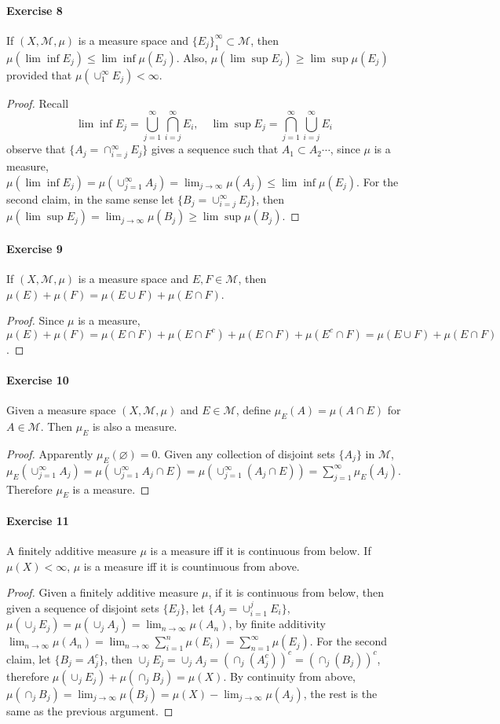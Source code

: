 \paragraph{Exercise 8}
If $(X,\mathcal{M},\mu)$ is a measure space and $\{E_j\}^\infty_1\subset\mathcal{M}$, then $\mu(\lim\inf E_j)\le\lim\inf\mu(E_j)$. Also, $\mu(\lim\sup E_j)\ge\lim\sup\mu(E_j)$ provided that $\mu(\cup^\infty_1E_j)<\infty$.
\begin{proof}
    Recall
    $$
    \lim\inf E_j=\bigcup_{j=1}^\infty\bigcap_{i=j}^\infty E_i,\quad \lim\sup E_j=\bigcap_{j=1}^\infty\bigcup_{i=j}^\infty E_i
    $$
    observe that $\{A_j=\cap^\infty_{i=j}E_j\}$ gives a sequence such that $A_1\subset A_2\cdots$, since $\mu$ is a measure, $\mu(\lim\inf E_j)=\mu(\cup^\infty_{j=1}A_j)=\lim_{j\to\infty}\mu(A_j)\le\lim\inf\mu(E_j)$. For the second claim, in the same sense let $\{B_j=\cup^\infty_{i=j}E_j\}$, then $\mu(\lim\sup E_j)=\lim_{j\to\infty}\mu(B_j)\ge\lim\sup\mu(B_j)$. 
\end{proof}
\paragraph{Exercise 9}
If $(X,\mathcal{M},\mu)$ is a measure space and $E,F\in\mathcal{M}$, then $\mu(E)+\mu(F)=\mu(E\cup F)+\mu(E\cap F)$.
\begin{proof}
    Since $\mu$ is a measure, $\mu(E)+\mu(F)=\mu(E\cap F)+\mu(E\cap F^c)+\mu(E\cap F)+\mu(E^c\cap F)=\mu(E\cup F)+\mu(E\cap F)$.
\end{proof}
\paragraph{Exercise 10}
Given a measure space $(X,\mathcal{M},\mu)$ and $E\in\mathcal{M}$, define $\mu_E(A)=\mu(A\cap E)$ for $A\in\mathcal{M}$. Then $\mu_E$ is also a measure.
\begin{proof}
    Apparently $\mu_E(\varnothing)=0$. Given any collection of disjoint sets $\{A_j\}$ in $\mathcal{M}$, $\mu_E(\cup^\infty_{j=1}A_j)=\mu(\cup^\infty_{j=1}A_j\cap E)=\mu(\cup^\infty_{j=1}(A_j\cap E))=\sum^\infty_{j=1}\mu_E(A_j)$. Therefore $\mu_E$ is a measure.
\end{proof}
\paragraph{Exercise 11}
A finitely additive measure $\mu$ is a measure iff it is continuous from below. If $\mu(X)<\infty$, $\mu$ is a measure iff it is countinuous from above.
\begin{proof}
    Given a finitely additive measure $\mu$, if it is continuous from below, then given a sequence of disjoint sets $\{E_j\}$, let $\{A_j=\cup_{i=1}^j E_i\}$, $\mu(\cup_jE_j)=\mu(\cup_jA_j)=\lim_{n\to\infty}\mu(A_n)$, by finite additivity $\lim_{n\to\infty}\mu(A_n)=\lim_{n\to\infty}\sum_{i=1}^n\mu(E_i)=\sum^\infty_{n=1}\mu(E_j)$. For the second claim, let $\{B_j=A_j^c\}$, then $\cup_j E_j=\cup_j A_j=(\cap_j(A_j^c))^c=(\cap_j(B_j))^c$, therefore $\mu(\cup_jE_j)+\mu(\cap_jB_j)=\mu(X)$. By continuity from above, $\mu(\cap_jB_j)=\lim_{j\to\infty}\mu(B_j)=\mu(X)-\lim_{j\to\infty}\mu(A_j)$, the rest is the same as the previous argument.
\end{proof}
